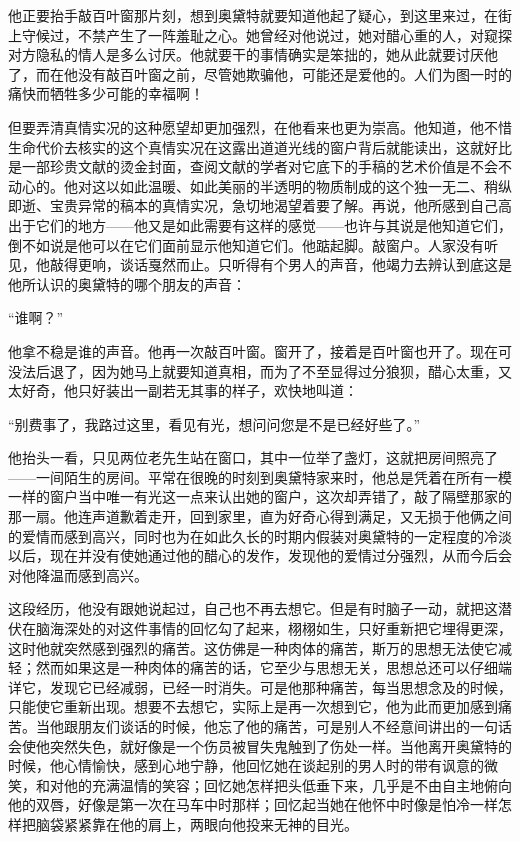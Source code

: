 \par 他正要抬手敲百叶窗那片刻，想到奥黛特就要知道他起了疑心，到这里来过，在街上守候过，不禁产生了一阵羞耻之心。她曾经对他说过，她对醋心重的人，对窥探对方隐私的情人是多么讨厌。他就要干的事情确实是笨拙的，她从此就要讨厌他了，而在他没有敲百叶窗之前，尽管她欺骗他，可能还是爱他的。人们为图一时的痛快而牺牲多少可能的幸福啊！
\par 但要弄清真情实况的这种愿望却更加强烈，在他看来也更为崇高。他知道，他不惜生命代价去核实的这个真情实况在这露出道道光线的窗户背后就能读出，这就好比是一部珍贵文献的烫金封面，查阅文献的学者对它底下的手稿的艺术价值是不会不动心的。他对这以如此温暖、如此美丽的半透明的物质制成的这个独一无二、稍纵即逝、宝贵异常的稿本的真情实况，急切地渴望着要了解。再说，他所感到自己高出于它们的地方——他又是如此需要有这样的感觉——也许与其说是他知道它们，倒不如说是他可以在它们面前显示他知道它们。他踮起脚。敲窗户。人家没有听见，他敲得更响，谈话戛然而止。只听得有个男人的声音，他竭力去辨认到底这是他所认识的奥黛特的哪个朋友的声音：
\par “谁啊？”
\par 他拿不稳是谁的声音。他再一次敲百叶窗。窗开了，接着是百叶窗也开了。现在可没法后退了，因为她马上就要知道真相，而为了不至显得过分狼狈，醋心太重，又太好奇，他只好装出一副若无其事的样子，欢快地叫道：
\par “别费事了，我路过这里，看见有光，想问问您是不是已经好些了。”
\par 他抬头一看，只见两位老先生站在窗口，其中一位举了盏灯，这就把房间照亮了——一间陌生的房间。平常在很晚的时刻到奥黛特家来时，他总是凭着在所有一模一样的窗户当中唯一有光这一点来认出她的窗户，这次却弄错了，敲了隔壁那家的那一扇。他连声道歉着走开，回到家里，直为好奇心得到满足，又无损于他俩之间的爱情而感到高兴，同时也为在如此久长的时期内假装对奥黛特的一定程度的冷淡以后，现在并没有使她通过他的醋心的发作，发现他的爱情过分强烈，从而今后会对他降温而感到高兴。
\par 这段经历，他没有跟她说起过，自己也不再去想它。但是有时脑子一动，就把这潜伏在脑海深处的对这件事情的回忆勾了起来，栩栩如生，只好重新把它埋得更深，这时他就突然感到强烈的痛苦。这仿佛是一种肉体的痛苦，斯万的思想无法使它减轻；然而如果这是一种肉体的痛苦的话，它至少与思想无关，思想总还可以仔细端详它，发现它已经减弱，已经一时消失。可是他那种痛苦，每当思想念及的时候，只能使它重新出现。想要不去想它，实际上是再一次想到它，他为此而更加感到痛苦。当他跟朋友们谈话的时候，他忘了他的痛苦，可是别人不经意间讲出的一句话会使他突然失色，就好像是一个伤员被冒失鬼触到了伤处一样。当他离开奥黛特的时候，他心情愉快，感到心地宁静，他回忆她在谈起别的男人时的带有讽意的微笑，和对他的充满温情的笑容；回忆她怎样把头低垂下来，几乎是不由自主地俯向他的双唇，好像是第一次在马车中时那样；回忆起当她在他怀中时像是怕冷一样怎样把脑袋紧紧靠在他的肩上，两眼向他投来无神的目光。

